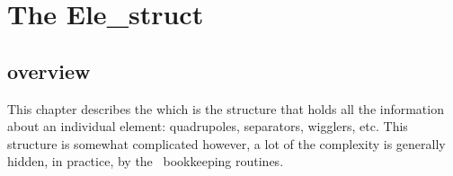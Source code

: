 \chapter{The Ele\_struct}
\label{c:ele_struct}

\section{overview}

This chapter describes the  which is the structure that
holds all the information about an individual element: quadrupoles,
separators, wigglers, etc. This structure is somewhat complicated however,
a lot of the complexity is generally hidden, in practice, by the \bmad\ 
bookkeeping routines.

